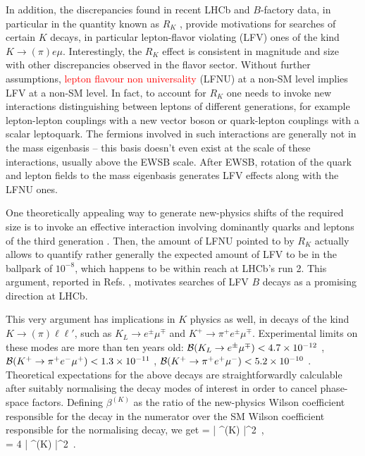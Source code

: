 In addition,   the discrepancies found in recent LHCb and $B$-factory data, in particular in the quantity known as $R_K$ \cite{Aaij:2014ora},  provide motivations for searches of certain $K$ decays, in particular lepton-flavor violating (LFV) ones of the kind $K \to (\pi) e \mu$.  Interestingly, the $R_K$ effect is consistent in magnitude and size with other discrepancies observed in the flavor sector. Without further assumptions, \textcolor{red}{lepton flavour non universality} (LFNU) at a non-SM level implies LFV at a non-SM level. In fact, to account for $R_K$ one needs to invoke new interactions distinguishing between leptons of different generations, for example lepton-lepton couplings with a new vector boson or quark-lepton couplings with a scalar leptoquark. The fermions involved in such interactions are generally not in the mass eigenbasis -- this basis doesn't even exist at the scale of these interactions, usually above the EWSB scale. After EWSB, rotation of the quark and lepton fields to the mass eigenbasis generates LFV effects along with the LFNU ones.

One theoretically appealing way to generate new-physics shifts of the required size is to invoke an effective interaction involving dominantly quarks and leptons of the third generation \cite{Glashow:2014iga}. Then, the amount of LFNU pointed to by $R_K$ actually allows to quantify rather generally the expected amount of LFV to be in the ballpark of $10^{-8}$, which happens to be within reach at LHCb's run 2. This argument, reported in Refs. \cite{Guadagnoli:2016erb,Glashow:2014iga}, motivates searches of LFV $B$ decays as a promising direction at LHCb.

This very argument has implications in $K$ physics as well, in decays of the kind $K \to (\pi) \ell \ell'$, such as $K_L \to e^\pm \mu^\mp$ and $K^+ \to \pi^+ e^\pm \mu^\mp$. Experimental limits on these modes are more than ten years old: $\mathcal B(K_L \rightarrow e^\pm \mu^\mp) < 4.7 \times 10^{-12}$ \cite{Ambrose:1998us}, $\mathcal B(K^+ \rightarrow \pi^+ e^- \mu^+) < 1.3 \times 10^{-11}$ \cite{Sher:2005sp}, $\mathcal B(K^+ \rightarrow \pi^+ e^+ \mu^-) < 5.2 \times 10^{-10}$ \cite{Appel:2000tc}. Theoretical expectations for the above decays are straightforwardly calculable after suitably normalising the decay modes of interest in order to cancel phase-space factors. Defining $\beta^{(K)}$ as the ratio of the new-physics Wilson coefficient responsible for the decay in the numerator over the SM Wilson coefficient responsible for the normalising decay, we get
\bea
\label{eq:LFV_K_decays}
 = | \beta^{(K)} |^2~, \\
\label{eq:LFV_K_decays_2}
 = 4 | \beta^{(K)} |^2~.
\eea

